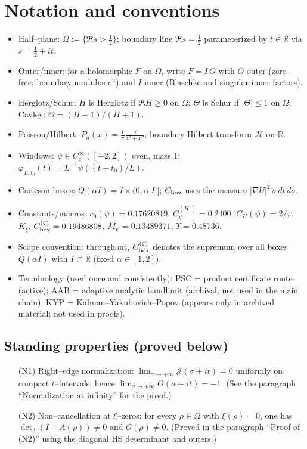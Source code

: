 \documentclass[11pt]{article}
\providecommand{\czeroplateau}{0.17620819}%
\providecommand{\CboxZeta}{K_0 + K_\xi}%
\providecommand{\CHone}{2/\pi}%
\newcommand{\Hilb}{\mathcal H}
\providecommand{\CpsiHone}{0.2400}%
\providecommand{\Mpsilocked}{(4/\pi)\,\CpsiHone\,\sqrt{\CboxZeta}}
\providecommand{\UpsilonLocked}{(2/\pi)\,\Mpsilocked/\czeroplateau}%
\renewcommand{\CboxZeta}{0.19486808}
\renewcommand{\Mpsilocked}{0.13489371}
\renewcommand{\UpsilonLocked}{0.48736}
\theoremstyle{definition}
\theoremstyle{remark}
\newcommand{\R}{\mathbb{R}}
\begin{document}
\section*{Notation and conventions}
\begin{itemize}
\item Half–plane: $\Omega:=\{\Re s>\tfrac12\}$; boundary line $\Re s=\tfrac12$ parameterized by $t\in\R$ via $s=\tfrac12+it$.
\item Outer/inner: for a holomorphic $F$ on $\Omega$, write $F=I\,O$ with $O$ outer (zero–free; boundary modulus $e^{u}$) and $I$ inner (Blaschke and singular inner factors).
\item Herglotz/Schur: $H$ is Herglotz if $\Re H\ge 0$ on $\Omega$; $\Theta$ is Schur if $|\Theta|\le 1$ on $\Omega$. Cayley: $\Theta=(H-1)/(H+1)$.
\item Poisson/Hilbert: $P_a(x)=\tfrac{1}{\pi}\tfrac{a}{a^2+x^2}$; boundary Hilbert transform $\Hilb$ on $\R$.
\item Windows: $\psi\in C_c^\infty([-2,2])$ even, mass 1; $\varphi_{L,t_0}(t)=L^{-1}\psi((t-t_0)/L)$.
\item Carleson boxes: $Q(\alpha I)=I\times(0,\alpha|I|]$; $C_{\rm box}$ uses the measure $|\nabla U|^2\,\sigma\,dt\,d\sigma$.
\item Constants/macros: $c_0(\psi)=\czeroplateau$, $C_\psi^{(H^1)}=\CpsiHone$, $C_H(\psi)=\CHone$, $K_\xi$, $C_{\rm box}^{(\zeta)}=\CboxZeta$, $M_\psi=\Mpsilocked$, $\Upsilon=\UpsilonLocked$.
\item Scope convention: throughout, $C_{\rm box}^{(\zeta)}$ denotes the supremum over all boxes $Q(\alpha I)$ with $I\subset\mathbb R$ (fixed $\alpha\in[1,2]$).
\item Terminology (used once and consistently): PSC = product certificate route (active); AAB = adaptive analytic bandlimit (archival, not used in the main chain); KYP = Kalman–Yakubovich–Popov (appears only in archived material; not used in proofs).
\end{itemize}

\subsection*{Standing properties (proved below)}\label{sec:standing-assumptions}
\begin{itemize}
\item[(N1)] Right--edge normalization: $\displaystyle \lim_{\sigma\to+\infty}\mathcal J(\sigma+it)=0$ uniformly on compact $t$--intervals; hence $\lim_{\sigma\to+\infty}\Theta(\sigma+it)=-1$. (See the paragraph ``Normalization at infinity'' for the proof.)
\item[(N2)] Non--cancellation at $\xi$--zeros: for every $\rho\in\Omega$ with $\xi(\rho)=0$, one has $\det_2(I-A(\rho))\ne 0$ and $\mathcal O(\rho)\ne 0$. (Proved in the paragraph ``Proof of (N2)'' using the diagonal HS determinant and outers.)
\end{itemize}
\end{document}
